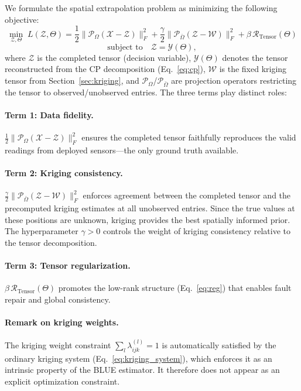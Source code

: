 \documentclass[journal]{IEEEtran}
\newcommand{\Pcal}{\mathcal{P}}
\newcommand{\Xcal}{\mathcal{X}}
\newcommand{\Zcal}{\mathcal{Z}}
\newcommand{\Ycal}{\mathcal{Y}}
\newcommand{\Wcal}{\mathcal{W}}
\newcommand{\Rcal}{\mathcal{R}}
\newcommand{\Omegaobs}{\Omega}
\newcommand{\Omegamis}{\bar{\Omega}}
\begin{document}
We formulate the spatial extrapolation problem as minimizing the following objective:
\begin{equation}\label{eq:obj}
\min_{\Zcal, \Theta}\; L(\Zcal, \Theta) = \frac{1}{2}\bigl\|\Pcal_{\Omegaobs}(\Xcal - \Zcal)\bigr\|_{F}^{2} + \frac{\gamma}{2}\bigl\|\Pcal_{\Omegamis}(\Zcal - \Wcal)\bigr\|_{F}^{2} + \beta\,\Rcal_{\mathrm{Tensor}}(\Theta)
\end{equation}
\begin{equation}\label{eq:constraints}
\text{subject to}\quad \Zcal = \Ycal(\Theta),
\end{equation}
where $\Zcal$ is the completed tensor (decision variable), $\Ycal(\Theta)$ denotes the tensor reconstructed from the CP decomposition (Eq.~\eqref{eq:cp}), $\Wcal$ is the fixed kriging tensor from Section~\ref{sec:kriging}, and $\Pcal_{\Omegaobs}$/$\Pcal_{\Omegamis}$ are projection operators restricting the tensor to observed/unobserved entries. The three terms play distinct roles:

\paragraph{Term 1: Data fidelity.}
$\frac{1}{2}\|\Pcal_{\Omegaobs}(\Xcal - \Zcal)\|_F^2$ ensures the completed tensor faithfully reproduces the valid readings from deployed sensors---the only ground truth available.

\paragraph{Term 2: Kriging consistency.}
$\frac{\gamma}{2}\|\Pcal_{\Omegamis}(\Zcal - \Wcal)\|_F^2$ enforces agreement between the completed tensor and the precomputed kriging estimates at all unobserved entries. Since the true values at these positions are unknown, kriging provides the best spatially informed prior. The hyperparameter $\gamma > 0$ controls the weight of kriging consistency relative to the tensor decomposition.

\paragraph{Term 3: Tensor regularization.}
$\beta\,\Rcal_{\mathrm{Tensor}}(\Theta)$ promotes the low-rank structure (Eq.~\eqref{eq:reg}) that enables fault repair and global consistency.

\paragraph{Remark on kriging weights.}
The kriging weight constraint $\sum_l \lambda_{ijk}^{(l)} = 1$ is automatically satisfied by the ordinary kriging system (Eq.~\eqref{eq:kriging_system}), which enforces it as an intrinsic property of the BLUE estimator. It therefore does not appear as an explicit optimization constraint.
\end{document}
